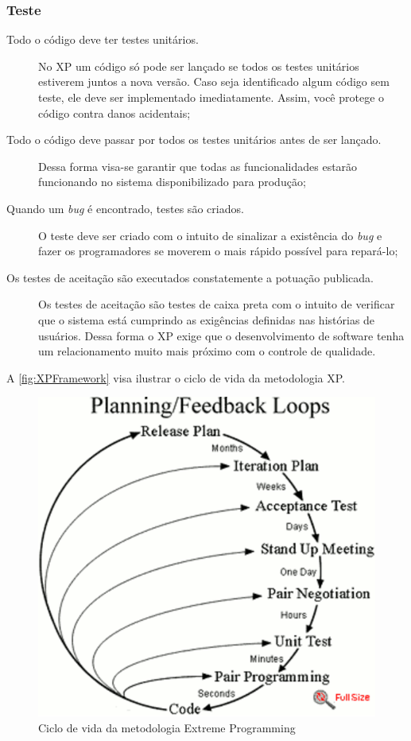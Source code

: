 \subsubsection{Teste}
\begin{description}
    \item[Todo o código deve ter testes unitários.] No \gls{XP} um código só pode ser
    lançado se todos os testes unitários estiverem juntos a nova versão. Caso seja
    identificado algum código sem teste, ele deve ser implementado imediatamente. Assim,
    você protege o código contra danos acidentais;
    \item[Todo o código deve passar por todos os testes unitários antes de ser lançado.]
    Dessa forma visa-se garantir que todas as funcionalidades estarão funcionando no
    sistema disponibilizado para produção;
    \item[Quando um \textit{bug} é encontrado, testes são criados.] O teste deve ser
    criado com o intuito de sinalizar a existência do \textit{bug} e fazer os
    programadores se moverem o mais rápido possível para repará-lo;
    \item[Os testes de aceitação são executados constatemente a potuação publicada.]
    Os testes de aceitação são testes de caixa preta com o intuito de verificar que
    o sistema está cumprindo as exigências definidas nas histórias de usuários. Dessa
    forma o \gls{XP} exige que o desenvolvimento de software tenha um relacionamento
    muito mais próximo com o controle de qualidade.
\end{description}

A \autoref{fig:XPFramework} visa ilustrar o ciclo de vida da metodologia \acrlong{XP}.

    \begin{figure}[h]
      \caption{Ciclo de vida da metodologia  Extreme Programming\label{fig:XPFramework}}
      \centering
      \includegraphics[keepaspectratio=true,scale=0.8]{figuras/xpFramework.eps}
    \end{figure}

